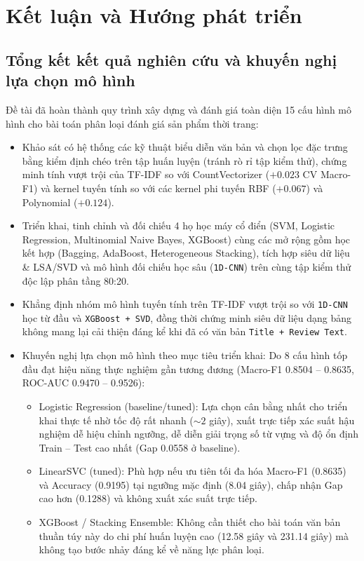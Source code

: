 \section{Kết luận và Hướng phát triển}

\subsection{Tổng kết kết quả nghiên cứu và khuyến nghị lựa chọn mô hình}
Đề tài đã hoàn thành quy trình xây dựng và đánh giá toàn diện 15 cấu hình mô hình cho bài toán phân loại đánh giá sản phẩm thời trang:
\begin{itemize}
    \item Khảo sát có hệ thống các kỹ thuật biểu diễn văn bản và chọn lọc đặc trưng bằng kiểm định chéo trên tập huấn luyện (tránh rò rỉ tập kiểm thử), chứng minh tính vượt trội của TF-IDF so với CountVectorizer ($+0.023$ CV Macro-F1) và kernel tuyến tính so với các kernel phi tuyến RBF ($+0.067$) và Polynomial ($+0.124$).
    \item Triển khai, tinh chỉnh và đối chiếu 4 họ học máy cổ điển (SVM, Logistic Regression, Multinomial Naive Bayes, XGBoost) cùng các mở rộng gồm học kết hợp (Bagging, AdaBoost, Heterogeneous Stacking), tích hợp siêu dữ liệu \& LSA/SVD và mô hình đối chiếu học sâu (\texttt{1D-CNN}) trên cùng tập kiểm thử độc lập phân tầng 80:20.
    \item Khẳng định nhóm mô hình tuyến tính trên TF-IDF vượt trội so với \texttt{1D-CNN} học từ đầu và \texttt{XGBoost + SVD}, đồng thời chứng minh siêu dữ liệu dạng bảng không mang lại cải thiện đáng kể khi đã có văn bản \texttt{Title + Review Text}.
    \item Khuyến nghị lựa chọn mô hình theo mục tiêu triển khai: Do 8 cấu hình tốp đầu đạt hiệu năng thực nghiệm gần tương đương (Macro-F1 0.8504 -- 0.8635, ROC-AUC 0.9470 -- 0.9526):
    \begin{itemize}
        \item Logistic Regression (baseline/tuned): Lựa chọn cân bằng nhất cho triển khai thực tế nhờ tốc độ rất nhanh ($\sim 2$ giây), xuất trực tiếp xác suất hậu nghiệm dễ hiệu chỉnh ngưỡng, dễ diễn giải trọng số từ vựng và độ ổn định Train -- Test cao nhất (Gap 0.0558 ở baseline).
        \item LinearSVC (tuned): Phù hợp nếu ưu tiên tối đa hóa Macro-F1 (0.8635) và Accuracy (0.9195) tại ngưỡng mặc định (8.04 giây), chấp nhận Gap cao hơn (0.1288) và không xuất xác suất trực tiếp.
        \item XGBoost / Stacking Ensemble: Không cần thiết cho bài toán văn bản thuần túy này do chi phí huấn luyện cao (12.58 giây và 231.14 giây) mà không tạo bước nhảy đáng kể về năng lực phân loại.
    \end{itemize}
\end{itemize}

